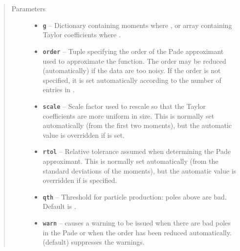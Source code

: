 \documentclass[letterpaper,10pt,english]{sphinxmanual}
\begin{document}
\begin{fulllineitems}
\begin{itemize}
\begin{description}
\end{description}

\end{itemize}
\begin{quote}\begin{description}
\item[{Parameters}] \leavevmode\begin{itemize}
\item {} 
\textbf{\texttt{g}} -- Dictionary containing moments where ,
or array containing Taylor coefficients where
.

\item {} 
\textbf{\texttt{order}} -- Tuple  specifying the order of the Pade
approximant used to approximate the function. The order may
be reduced (automatically) if the data are too noisy.
If the order is not specified, it is set automatically
according to the number of entries in .

\item {} 
\textbf{\texttt{scale}} -- Scale factor used to rescale  so that
the Taylor coefficients are more uniform in size. This is
normally set automatically (from the first two moments),
but the automatic value is overridden if  is set.

\item {} 
\textbf{\texttt{rtol}} -- Relative tolerance assumed when determining the
Pade approximant. This is normally set automatically
(from the standard deviations of the moments), but the
automatic value is overridden if  is specified.

\item {} 
\textbf{\texttt{qth}} -- Threshold for particle production: poles above 
are bad. Default is .

\item {} 
\textbf{\texttt{warn}} --  causes a warning to be issued when there are
bad poles in the Pade or when the order has been reduced
automatically.  (default) suppresses the warnings.

\end{itemize}

\end{description}\end{quote}

\end{fulllineitems}

\end{document}
